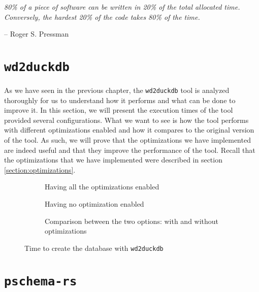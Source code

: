 \epigraph{\textit{80\% of a piece of software can be written in 20\% of the total allocated time. Conversely, the hardest 20\% of the code takes 80\% of the time.}}{-- \textup{Roger S. Pressman}}

\section{\texttt{wd2duckdb}}

As we have seen in the previous chapter, the \texttt{wd2duckdb} tool is analyzed thoroughly for us to understand how it performs and what can be done to improve it. In this section, we will present the execution times of the tool provided several configurations. What we want to see is how the tool performs with different optimizations enabled and how it compares to the original version of the tool. As such, we will prove that the optimizations we have implemented are indeed useful and that they improve the performance of the tool. Recall that the optimizations that we have implemented were described in section \ref{section:optimizations}.

\begin{figure}[p]
    \begin{subfigure}{0.49\textwidth}
        \centering
        
        \caption{Having all the optimizations enabled}
    \end{subfigure}%
    \hfill
    \begin{subfigure}{0.49\textwidth}
        \centering
        
        \caption{Having no optimization enabled}
    \end{subfigure}%
    \vspace*{1em}
    \begin{subfigure}{\textwidth}
        \centering
        
        \caption{Comparison between the two options: with and without optimizations}
    \end{subfigure}
    \caption{Time to create the database with \texttt{wd2duckdb}}
\end{figure}


\section{\texttt{pschema-rs}}

